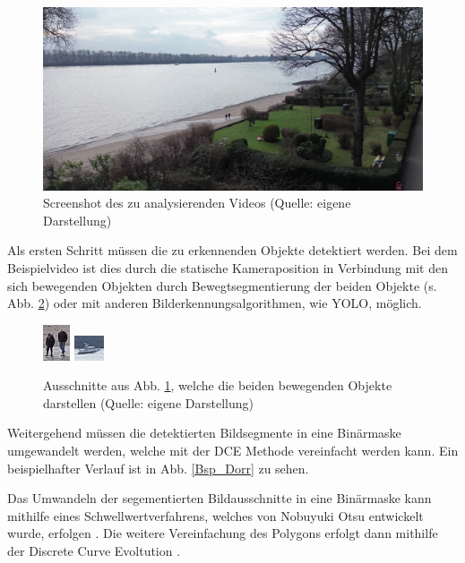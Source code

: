 \documentclass[a4paper,11pt,pdftex]{scrreport}
\begin{document}
\begin{figure}[h]
    \centering
    \includegraphics[scale=0.2, keepaspectratio]{images/screenshot_video_moratz.png}
    \caption[Screenshot des zu analysierenden Videos]{Screenshot des zu analysierenden Videos (Quelle: eigene Darstellung)}
    \label{Scr_ges_Vid}
\end{figure}



Als ersten Schritt müssen die zu erkennenden Objekte detektiert werden. Bei dem Beispielvideo ist dies durch die statische Kameraposition in Verbindung mit den sich bewegenden Objekten durch Bewegtsegmentierung der beiden Objekte (s. Abb. \ref{Scr_detail_Obj}) oder mit anderen Bilderkennungsalgorithmen, wie YOLO, möglich. 

\begin{figure}[h]
    \centering
    \includegraphics[scale = 4, keepaspectratio] {images/detail_screenshot_people.png}
    \includegraphics[scale = 4, keepaspectratio]{images/detail_screenshot_boat.png}
    \caption[Ausschnitte aus Abb. \ref{Scr_ges_Vid}, welche die beiden bewegenden Objekte darstellen ]{Ausschnitte aus Abb. \ref{Scr_ges_Vid}, welche die beiden bewegenden Objekte darstellen (Quelle: eigene Darstellung)}
    \label{Scr_detail_Obj}
\end{figure}

Weitergehend müssen die detektierten Bildsegmente in eine Binärmaske umgewandelt werden, welche mit der DCE Methode vereinfacht werden kann. Ein beispielhafter Verlauf ist in Abb. \ref{Bsp_Dorr} zu sehen.

Das Umwandeln der segementierten Bildausschnitte in eine Binärmaske kann mithilfe eines Schwellwertverfahrens, welches von Nobuyuki Otsu entwickelt wurde, erfolgen \citep{Otsu1979}. Die weitere Vereinfachung des Polygons erfolgt dann mithilfe der Discrete Curve Evoltution \citep{Barkowsky2000}. 
\end{document}

